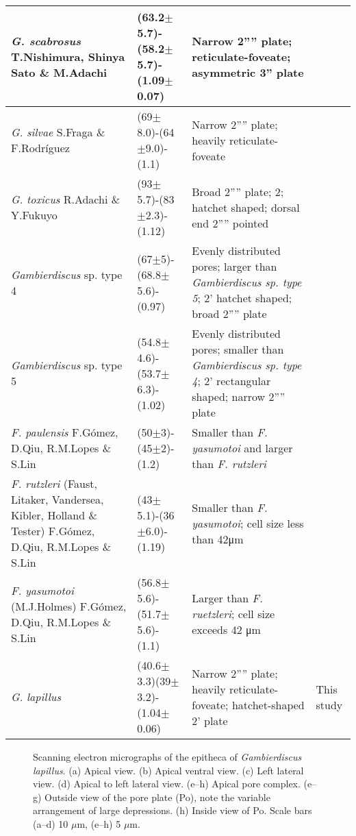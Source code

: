 \documentclass[12pt]{article}
\begin{document}
\begin{longtable}{ | p{5cm} | p{2cm} | p{6cm} | p{2cm} |}
 \hline
\textit{G. scabrosus} T.Nishimura, Shinya Sato \& M.Adachi	& (63.2$\pm$5.7)-(58.2$\pm$5.7)-(1.09$\pm$0.07) & Narrow 2'''' plate; reticulate-foveate; asymmetric 3” plate & \citep{nishimura2014morphology,nishimura2013genetic,kuno2010genetic}  \\
 \hline
 \textit{G. silvae}	S.Fraga \& F.Rodr{\'i}guez & (69$\pm$8.0)-(64$\pm$9.0)-(1.1) & Narrow 2'''' plate; heavily reticulate-foveate & \citep{fraga2014genus,litaker2010global} \\
 \hline
\textit{G. toxicus} R.Adachi \& Y.Fukuyo & (93$\pm$5.7)-(83$\pm$2.3)-(1.12) & Broad 2'''' plate; 2; hatchet shaped; dorsal end 2'''' pointed & \citep{litaker2009taxonomy,adachi1979thecal,chinain1997intraspecific,richlen2008phylogeography}\\
 \hline
 \emph{Gambierdiscus} sp. type 4	& (67$\pm$5)-(68.8$\pm$5.6)-(0.97) & Evenly distributed pores; larger than \textit{Gambierdiscus sp. type 5}; 2’ hatchet shaped; broad 2'''' plate 
 & \citep{xu2014distribution}\\
 \hline
 \emph{Gambierdiscus} sp. type 5 & (54.8$\pm$4.6)-(53.7$\pm$6.3)-(1.02) & Evenly distributed pores; smaller than \textit{Gambierdiscus sp. type 4}; 2’ rectangular shaped; narrow 2'''' plate &  \citep{xu2014distribution} \\
 \hline
 \textit{F. paulensis} F.Gómez, D.Qiu, R.M.Lopes \& S.Lin & (50$\pm$3)-(45$\pm$2)-(1.2) & Smaller than \textit{F. yasumotoi} and larger than \textit{F. rutzleri} & \citep{gomez2015fukuyoa} \\
 \hline
\textit{F. rutzleri }(Faust, Litaker, Vandersea, Kibler, Holland \& Tester) F.Gómez, D.Qiu, R.M.Lopes \& S.Lin& (43$\pm$5.1)-(36$\pm$6.0)-(1.19) & Smaller than \textit{F. yasumotoi}; cell size less than 42μm &  \citep{litaker2009taxonomy}\\
 \hline
\textit{F. yasumotoi }(M.J.Holmes) F.Gómez, D.Qiu, R.M.Lopes \& S.Lin& (56.8$\pm$5.6)-(51.7$\pm$5.6)-(1.1) & Larger than \textit{F. ruetzleri}; cell size exceeds 42 μm & \citep{litaker2009taxonomy,holmes1998gambierdiscus}  \\
 \hline
\textit{G. lapillus}  & (40.6$\pm$3.3)(39$\pm$3.2)-(1.04$\pm$0.06) & Narrow 2'''' plate; heavily reticulate-foveate; hatchet-shaped 2' plate & This study\\
   \hline
\end{longtable}
\FloatBarrier



\FloatBarrier 
\begin{figure} 
\caption{Scanning electron micrographs of the epitheca of \textit{Gambierdiscus lapillus}. (a) Apical view. (b) Apical ventral view. (c) Left lateral view. (d) Apical to left lateral view. (e–h) Apical pore complex. (e–g) Outside view of the pore plate (Po), note the variable arrangement of large depressions. (h) Inside view of Po. Scale bars (a–d) 10 $\mu$m, (e–h) 5 $\mu$m.} 
\label{fig:epiSEM}
\end{figure} 
\FloatBarrier 
\end{document}
